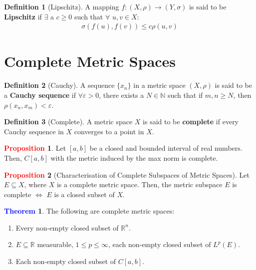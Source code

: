 \documentclass[11pt]{article}
\theoremstyle{definition}
\theoremstyle{definition}
\newcommand{\R}[0]{\mathbb{R}}
\newtheorem{theorem}{\textcolor{blue}{Theorem}}
\theoremstyle{definition}
\newtheorem{definition}{\textcolor{OliveGreen}{Definition}}
\newtheorem{prop}{\textcolor{red}{Proposition}}
\theoremstyle{remark}
\begin{document}
\begin{definition}[Lipschitz] 
	A mapping $f: (X, \rho) \rightarrow (Y, \sigma)$ is said to be \textbf{Lipschitz} if $\exists$ a $c \geq 0$ such that $\forall$ $u, v \in X$: 
	\begin{align*}
		\sigma(f (u), f(v) ) \leq c \rho(u,v) 	
	\end{align*}
\end{definition}

\section{Complete Metric Spaces} 

\begin{definition}[Cauchy] A sequence $\{ x_n \}$ in a metric space $(X, \rho)$ is said to be a \textbf{Cauchy sequence} if $\forall \varepsilon > 0$, there exists a $N \in \mathbb{N}$ such that if $m, n \geq N$, then $\rho(x_n, x_m) < \varepsilon$. 
\end{definition}

\begin{definition}[Complete]
	A metric space $X$ is said to be \textbf{complete} if every Cauchy sequence in $X$ converges to a point in $X$. 
\end{definition}

\begin{prop}
	Let $[a,b]$ be a closed and bounded interval of real numbers. Then, $C[a,b]$ with the metric induced by the max norm is complete. 
\end{prop}

\begin{prop}[Characterisation of Complete Subspaces of Metric Spaces]
	Let $E \subseteq X$, where $X$ is a complete metric space. Then, the metric subspace $E$ is complete $\iff$ $E$ is a closed subset of $X$. 
\end{prop}

\begin{theorem}
	The following are complete metric spaces: 
	\begin{enumerate}[noitemsep]
		\item Every non-empty closed subset of $\R^n$. 
		\item $E \subseteq \R$ measurable, $1 \leq p \leq \infty$, each non-empty closed subset of $L^p(E)$. 
		\item Each non-empty closed subset of $C[a,b]$. 
	\end{enumerate}
\end{theorem}
\end{document}
